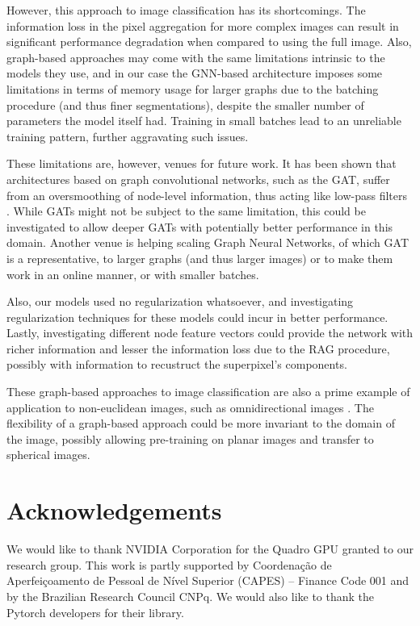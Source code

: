 \documentclass[twocolumn]{article}
\begin{document}
However, this approach to image classification has its shortcomings. The information loss in the pixel aggregation for more complex images can result in significant performance degradation when compared to using the full image. Also, graph-based approaches may come with the same limitations intrinsic to the models they use, and in our case the GNN-based architecture imposes some limitations in terms of memory usage for larger graphs due to the batching procedure (and thus finer segmentations), despite the smaller number of parameters the model itself had. Training in small batches lead to an unreliable training pattern, further aggravating such issues.

These limitations are, however, venues for future work. It has been shown that architectures based on graph convolutional networks, such as the GAT, suffer from an oversmoothing of node-level information, thus acting like low-pass filters \cite{nt2019lowpassfilters}.
While GATs might not be subject to the same limitation, this could be investigated to allow deeper GATs with potentially better performance in this domain. 
Another venue is helping scaling Graph Neural Networks, of which GAT is a representative, to larger graphs (and thus larger images) or to make them work in an online manner, or with smaller batches.

Also, our models used no regularization whatsoever, and investigating regularization techniques for these models could incur in better performance. Lastly, investigating different node feature vectors could provide the network with richer information and lesser the information loss due to the RAG procedure, possibly with information to recustruct the superpixel's components.

These graph-based approaches to image classification are also a prime example of application to non-euclidean images, such as omnidirectional images \cite{lee2019spherephd}. The flexibility of a graph-based approach could be more invariant to the domain of the image, possibly allowing pre-training on planar images and transfer to spherical images.

\section*{Acknowledgements}We would like to thank NVIDIA Corporation for the Quadro GPU granted to our research group. This work is partly supported by Coordenação de Aperfeiçoamento de Pessoal de Nível Superior (CAPES) -- Finance Code 001 and by the Brazilian Research Council CNPq. We would also like to thank the Pytorch developers for their library.



\end{document}
